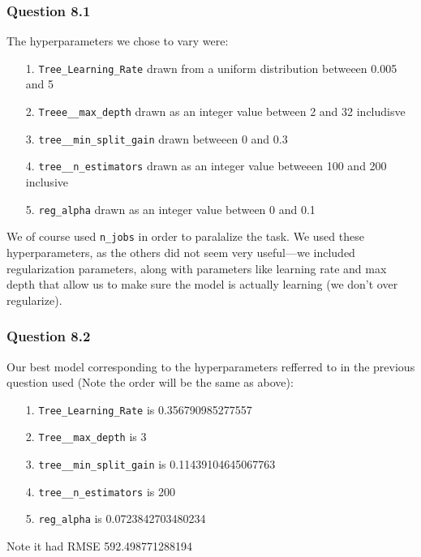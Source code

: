 \documentclass[11pt,letterpaper]{article}
\begin{document}
\subsubsection*{Question 8.1}
The hyperparameters we chose to vary were:
\begin{enumerate}
\item[1.] \texttt{Tree_Learning_Rate} drawn from a uniform distribution betweeen 0.005 and 5
\item[2.] \texttt{Treee__max_depth} drawn as an integer value between 2 and 32 includisve
\item[3.] \texttt{tree__min_split_gain} drawn betweeen 0 and 0.3 
\item[4.] \texttt{tree__n_estimators} drawn as an integer value betweeen 100 and 200 inclusive
\item[5.] \texttt{reg_alpha} drawn as an integer value between 0 and 0.1
\end{enumerate}
We of course used \texttt{n_jobs} in order to paralalize the task. We used these 
hyperparameters, as the others did not seem very useful—we included regularization 
parameters, along with parameters like learning rate and max depth that 
allow us to make sure the model is actually learning (we don't over regularize).
\subsubsection*{Question 8.2}
Our best model corresponding to the hyperparameters refferred to in the previous question 
used (Note the order will be the same as above):
\begin{enumerate}
\item[1.] \texttt{Tree_Learning_Rate} is 0.356790985277557
\item[2.] \texttt{Tree__max_depth} is 3
\item[3.] \texttt{tree__min_split_gain} is  0.11439104645067763
\item[4.] \texttt{tree__n_estimators} is 200
\item[5.] \texttt{reg_alpha} is 0.0723842703480234
\end{enumerate}
Note it had RMSE 592.498771288194
\end{document}
